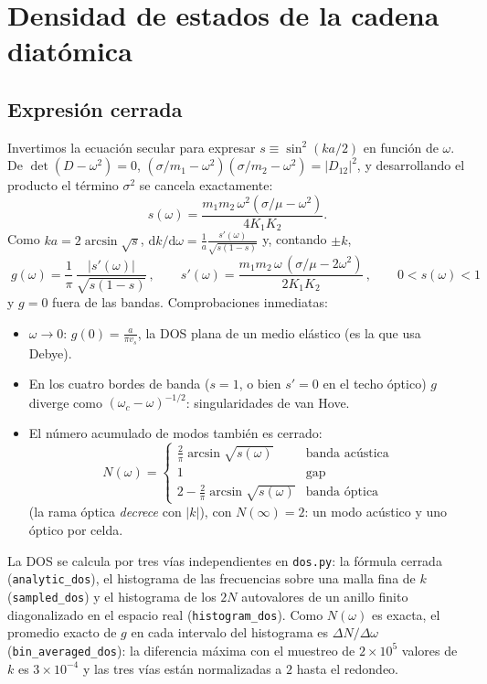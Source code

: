 \documentclass[11pt,a4paper]{article}
\newcommand{\dd}{\mathrm{d}}
\newcommand{\vs}{v_{s}}
\newcommand{\code}[1]{\texttt{#1}}
\begin{document}
\section{Densidad de estados de la cadena diatómica}

\subsection{Expresión cerrada}

Invertimos la ecuación secular para expresar $s\equiv\sin^2(ka/2)$ en función
de $\omega$. De $\det(D-\omega^2)=0$,
$(\sigma/m_1-\omega^2)(\sigma/m_2-\omega^2)=|D_{12}|^2$, y desarrollando el
producto el término $\sigma^2$ se cancela exactamente:
\begin{equation}
s(\omega)=\frac{m_1m_2\,\omega^2\left(\sigma/\mu-\omega^2\right)}{4K_1K_2}.
\end{equation}
Como $ka=2\arcsin\sqrt{s}$, $\dd k/\dd\omega=\frac{1}{a}\frac{s'(\omega)}{\sqrt{s(1-s)}}$
y, contando $\pm k$,
\begin{equation}
\boxed{\;g(\omega)=\frac{1}{\pi}\,\frac{|s'(\omega)|}{\sqrt{s(1-s)}}\,,
\qquad s'(\omega)=\frac{m_1m_2\,\omega\,(\sigma/\mu-2\omega^2)}{2K_1K_2}\,,
\qquad 0<s(\omega)<1\;}
\end{equation}
y $g=0$ fuera de las bandas. Comprobaciones inmediatas:
\begin{itemize}
\item $\omega\to0$: $g(0)=\frac{a}{\pi\vs}$, la DOS plana de un medio elástico
  (es la que usa Debye).
\item En los cuatro bordes de banda ($s=1$, o bien $s'=0$ en el techo óptico)
  $g$ diverge como $(\omega_c-\omega)^{-1/2}$: singularidades de van Hove.
\item El número acumulado de modos también es cerrado:
\begin{equation}
N(\omega)=\begin{cases}
\frac2\pi\arcsin\sqrt{s(\omega)} & \text{banda acústica}\\
1 & \text{gap}\\
2-\frac2\pi\arcsin\sqrt{s(\omega)} & \text{banda óptica}
\end{cases}
\end{equation}
(la rama óptica \emph{decrece} con $|k|$), con $N(\infty)=2$: un modo acústico
y uno óptico por celda.
\end{itemize}

\begin{codigo}
La DOS se calcula por tres vías independientes en \code{dos.py}: la fórmula
cerrada (\code{analytic\_dos}), el histograma de las frecuencias sobre una malla
fina de $k$ (\code{sampled\_dos}) y el histograma de los $2N$ autovalores de un
anillo finito diagonalizado en el espacio real (\code{histogram\_dos}). Como
$N(\omega)$ es exacta, el promedio exacto de $g$ en cada intervalo del
histograma es $\Delta N/\Delta\omega$ (\code{bin\_averaged\_dos}): la
diferencia máxima con el muestreo de $2\times10^5$ valores de $k$ es
$3\times10^{-4}$ y las tres vías están normalizadas a $2$ hasta el redondeo.
\end{codigo}
\end{document}
